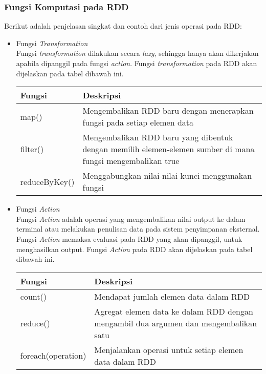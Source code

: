 \subsubsection{Fungsi Komputasi pada RDD}
\label{sec:fungsi_rdd}
\noindent Berikut adalah penjelasan singkat dan contoh dari jenis operasi pada RDD:

\begin{itemize}
\item Fungsi \textit{Transformation}\\
Fungsi \textit{transformation} dilakukan secara \textit{lazy}, sehingga hanya akan dikerjakan apabila dipanggil pada fungsi \textit{action}. Fungsi \textit{transformation} pada RDD akan dijelaskan pada tabel dibawah ini.\\

\begin{tabular}{|l|p{10cm}|}
\hline 
\rule[-1ex]{0pt}{2.5ex} Fungsi & Deskripsi \\ 
\hline 
\rule[-1ex]{0pt}{2.5ex} map() & Mengembalikan RDD baru dengan menerapkan fungsi pada setiap elemen data \\ 
\hline 
\rule[-1ex]{0pt}{2.5ex} filter() & Mengembalikan RDD baru yang dibentuk dengan memilih elemen-elemen sumber di mana fungsi mengembalikan true \\ 
\hline 
\rule[-1ex]{0pt}{2.5ex} reduceByKey() & Menggabungkan nilai-nilai kunci menggunakan fungsi \\ 
\hline 
\end{tabular} 

\vspace{0.2cm}

\item Fungsi \textit{Action}\\
Fungsi \textit{Action} adalah operasi yang mengembalikan nilai output ke dalam terminal atau melakukan penulisan data pada sistem penyimpanan eksternal. Fungsi \textit{Action} memaksa evaluasi pada RDD yang akan dipanggil, untuk menghasilkan output. Fungsi \textit{Action} pada RDD akan dijelaskan pada tabel dibawah ini.\\

\begin{tabular}{|l|p{10cm}|}
\hline 
\rule[-1ex]{0pt}{2.5ex} Fungsi & Deskripsi \\ 
\hline 
\rule[-1ex]{0pt}{2.5ex} count() & Mendapat jumlah elemen data dalam RDD \\ 
\hline 
\rule[-1ex]{0pt}{2.5ex} reduce() & Agregat elemen data ke dalam RDD dengan mengambil dua argumen dan mengembalikan satu \\ 
\hline 
\rule[-1ex]{0pt}{2.5ex} foreach(operation) & Menjalankan operasi untuk setiap elemen data dalam RDD \\ 
\hline 
\end{tabular} 
\end{itemize}

